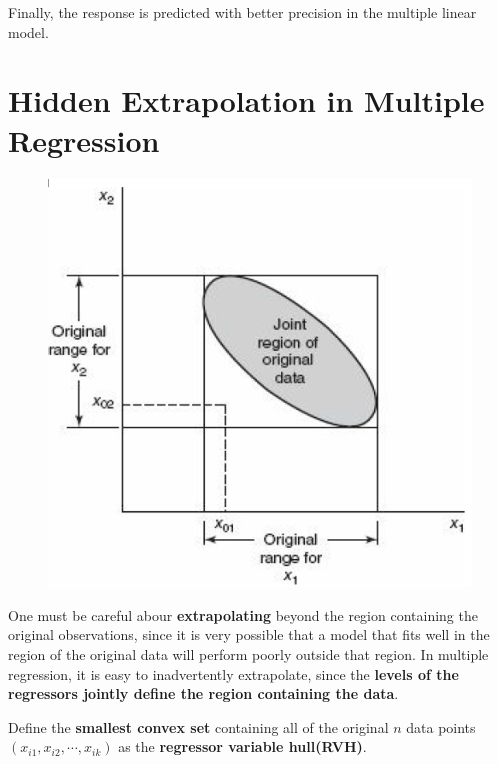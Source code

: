 \documentclass[12pt]{article}
\begin{document}
Finally, the response is predicted with better precision in the multiple linear model. 


\setcounter{section}{7}
\section{Hidden Extrapolation in Multiple Regression}

\begin{figure}[h!]
	\centering
	\includegraphics[scale=0.8]{HiddenExtrapolate.png}
\end{figure}

One must be careful abour \textbf{extrapolating} beyond the region containing the original observations, since it is very possible that a model that fits well in the region of the original data will perform poorly outside that region. In multiple regression, it is easy to inadvertently extrapolate, since the \textbf{levels of the regressors jointly define the region containing the data}. 

Define the \textbf{smallest convex set} containing all of the original $n$ data points $(x_{i1}, x_{i2}, \cdots, x_{ik})$ as the \textbf{regressor variable hull(RVH)}. 
\end{document}
